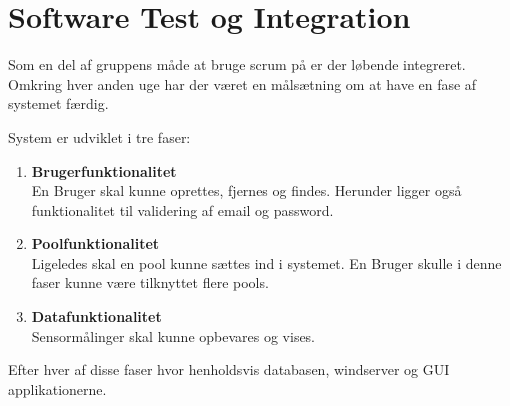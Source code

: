\chapter{Software Test og Integration}

Som en del af gruppens måde at bruge scrum på er der løbende integreret. Omkring hver anden uge har der været en målsætning om at have en fase af systemet færdig. 

System er udviklet i tre faser: 

\begin{enumerate}
	\item \textbf{Brugerfunktionalitet}\\
	En Bruger skal kunne oprettes, fjernes og findes. Herunder ligger også funktionalitet til validering af email og password. 
	\item \textbf{Poolfunktionalitet}\\
	Ligeledes skal en pool kunne sættes ind i systemet. En Bruger skulle i denne faser kunne være tilknyttet flere pools.
	\item \textbf{Datafunktionalitet}\\
	Sensormålinger skal kunne opbevares og vises. 
\end{enumerate}

Efter hver af disse faser hvor henholdsvis databasen, \gls{windserver} og GUI applikationerne.






%
%
%


